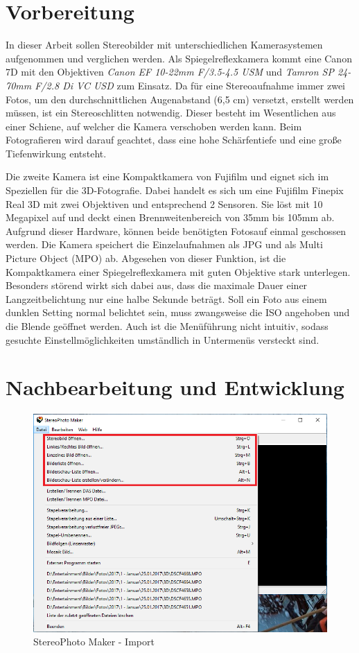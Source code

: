 \documentclass[liststotoc,bibtotoc,fontsize=14pt,]{scrreprt}
\begin{document}
	\chapter{Vorbereitung}
		In dieser Arbeit sollen Stereobilder mit unterschiedlichen Kamerasystemen aufgenommen und verglichen werden. Als Spiegelreflexkamera kommt eine Canon 7D mit den Objektiven \textit{Canon EF 10-22mm F/3.5-4.5 USM} und	\textit{Tamron SP 24-70mm F/2.8 Di VC USD} zum Einsatz. Da für eine Stereoaufnahme immer zwei Fotos, um den durchschnittlichen Augenabstand (6,5 cm) versetzt, erstellt werden müssen, ist ein Stereoschlitten notwendig. Dieser besteht im Wesentlichen aus einer Schiene, auf welcher die Kamera verschoben werden kann. Beim Fotografieren wird darauf geachtet, dass eine hohe Schärfentiefe und eine große Tiefenwirkung entsteht.
		
		Die zweite Kamera ist eine Kompaktkamera von Fujifilm und eignet sich im Speziellen für die 3D-Fotografie. Dabei handelt es sich um eine Fujifilm Finepix Real 3D mit zwei Objektiven und entsprechend 2 Sensoren. Sie löst mit 10 Megapixel auf und deckt einen Brennweitenbereich von 35mm bis 105mm ab. Aufgrund dieser Hardware, können beide benötigten Fotosauf einmal geschossen werden. Die Kamera speichert die Einzelaufnahmen als JPG und als Multi Picture Object (MPO) ab. Abgesehen von dieser Funktion, ist die Kompaktkamera einer Spiegelreflexkamera mit guten Objektive stark unterlegen. Besonders störend wirkt sich dabei aus, dass die maximale Dauer einer Langzeitbelichtung nur eine halbe Sekunde beträgt. Soll ein Foto aus einem dunklen Setting normal belichtet sein, muss zwangsweise die ISO angehoben und die Blende geöffnet werden. Auch ist die Menüführung nicht intuitiv, sodass gesuchte Einstellmöglichkeiten umständlich in Untermenüs versteckt sind.
		
		

	\chapter{Nachbearbeitung und Entwicklung}

		\begin{figure}[H]
			\includegraphics[width=\linewidth]{img/steps/step1.png}
			\caption{StereoPhoto Maker - Import}
			\label{img:maker_import}
		\end{figure}
		
\end{document}

